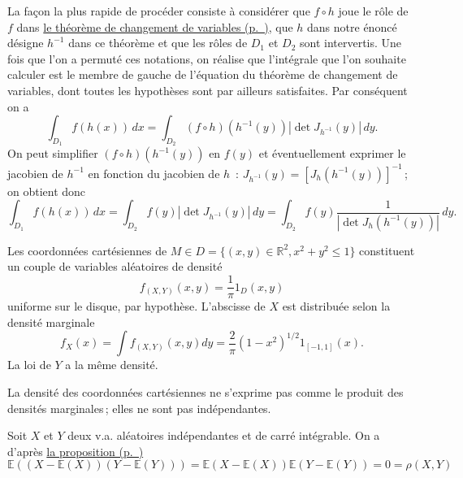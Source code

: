 \label{II-answer-adj}
La façon la plus rapide de procéder consiste à considérer que
\(f \circ h\) joue le rôle de \(f\) dans
\protect\hyperref[II-theorem-changement-de-variables]{le théorème de
changement de
variables (p.~\pageref*{II-theorem-changement-de-variables})}, que \(h\)
dans notre énoncé désigne \(h^{-1}\) dans ce théorème et que les rôles
de \(D_1\) et \(D_2\) sont intervertis. Une fois que l'on a permuté ces
notations, on réalise que l'intégrale que l'on souhaite calculer est le
membre de gauche de l'équation du théorème de changement de variables,
dont toutes les hypothèses sont par ailleurs satisfaites. Par conséquent
on a \[
\int_{D_1} f (h(x)) \, dx = \int_{D_2} (f \circ h)(h^{-1}(y)) |\det J_{h^{-1}}(y)| \, dy.
\] On peut simplifier \((f \circ h)(h^{-1}(y))\) en \(f(y)\) et
éventuellement exprimer le jacobien de \(h^{-1}\) en fonction du
jacobien de \(h\)~: \(J_{h^{-1}}(y) = [J_{h}(h^{-1}(y))]^{-1}\)\,; on
obtient donc \[
\int_{D_1} f (h(x)) \, dx = 
\int_{D_2} f(y) |\det J_{h^{-1}}(y)| \, dy = 
\int_{D_2} f(y) \frac{1}{|\det J_{h}(h^{-1}(y))|} \, dy.
\]

\label{II-answer-exo-flechette}
Les coordonnées cartésiennes de
\(M \in D = \{(x,y) \in \mathbb{R}^2 , x^2+y^2 \leq 1\}\) constituent un
couple de variables aléatoires de densité
\[f_{(X,Y)}(x,y) = \frac{1}{\pi}1_{D} (x,y)\] uniforme sur le disque,
par hypothèse. L'abscisse de \(X\) est distribuée selon la densité
marginale
\[f_X(x) = \int f_{(X,Y)}(x,y) dy = \frac{2}{\pi} (1-x^2)^{1/2} 1_{[-1,1]}(x).\]
La loi de \(Y\) a la même densité.

\label{II-answer-exo-flechettebis}
La densité des coordonnées cartésiennes ne s'exprime pas comme le
produit des densités marginales\,; elles ne sont pas indépendantes.

\label{II-answer-demo-cov-indep}
Soit \(X\) et \(Y\) deux v.a. aléatoires indépendantes et de carré
intégrable. On a d'après \protect\hyperref[II-indep_fct]{la
proposition (p.~\pageref*{II-indep_fct})}
\[\mathbb{E}((X-\mathbb{E}(X))(Y-\mathbb{E}(Y))) = \mathbb{E}(X-\mathbb{E}(X))\mathbb{E}(Y-\mathbb{E}(Y)) = 0 = \rho(X,Y)\]


